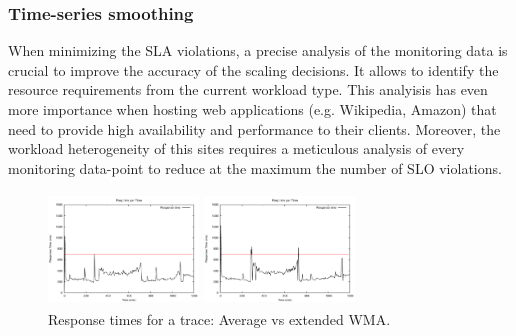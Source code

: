 
\subsubsection{Time-series smoothing}

When minimizing the SLA violations, a precise analysis of the monitoring data is crucial to improve the accuracy of the scaling decisions. It allows to identify the resource requirements from the current workload type. This analyisis has even more importance when hosting web applications (e.g. Wikipedia, Amazon) that need to provide high availability and performance to their clients. Moreover, the workload heterogeneity of this sites requires a meticulous analysis of every monitoring data-point to reduce at the maximum the number of SLO violations. 

\begin{figure}[htb]
	\begin{minipage}[b]{0.49\linewidth}
		\includegraphics[width=4cm,height=3cm]{images/data2007/proxy_outputAvg.pdf}	
		\vspace{-4mm}
	\end{minipage}
	\hfill
	\begin{minipage}[b]{0.49\linewidth}
		\includegraphics[width=4cm,height=3cm]{images/data2007/proxy_outputWMA.pdf}
		\vspace{-4mm}
	\end{minipage}
\caption{Response times for a trace: Average vs extended WMA.}
\label{fig:data_analysis}
\end{figure}

